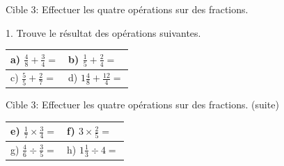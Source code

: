 \documentclass[11pt]{article}
\begin{document}
\begin{cible}{Cible 3:  Effectuer les quatre opérations sur des fractions.}

  1. Trouve le résultat des opérations suivantes.

  \vspace{1cm}

  \renewcommand{\arraystretch}{1}
  \begin{tabular}{|p{7.7cm}|p{7.7cm}|}
    \hline
    \rule{0pt}{4mm} a) $\frac{4}{8}+\frac{3}{4}=$ & b) $\frac{1}{5}+\frac{2}{4}=$     \\[8cm]
    \hline
    \rule{0pt}{4mm} c) $\frac{5}{5}+\frac{2}{7}=$    & d) $1\frac{4}{8}+\frac{12}{4}=$   \\[8cm]
    \hline
  \end{tabular}

\end{cible}

\newpage

\begin{cible}{Cible 3: Effectuer les quatre opérations sur des fractions. (suite)}


  \vspace{1cm}

  \renewcommand{\arraystretch}{1}
  \begin{tabular}{|p{7.7cm}|p{7.7cm}|}
    \hline
    \rule{0pt}{4mm} e) $\frac{1}{7}\times\frac{3}{4}=$  & f) $3\times\frac{2}{5}=$      \\[8cm]
    \hline
    \rule{0pt}{4mm} g) $\frac{4}{6}\div \frac{3}{5}=$    & h) $1\frac{1}{3}\div4 =$   \\[8cm]
    \hline
  \end{tabular}

\end{cible}
\end{document}
